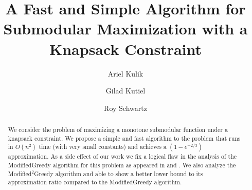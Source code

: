 \documentclass[a4paper,UKenglish,cleveref, autoref]{lipics-v2019}
\title{A Fast and Simple Algorithm for Submodular Maximization with a Knapsack Constraint}
\author{Ariel Kulik}{Department of Computer Science, Technion, Haifa, Israel}{gkutiel@cs.technion.ac.il}{}{}
\author{Gilad Kutiel}{Department of Computer Science, Technion, Haifa, Israel}{arielk@cs.technion.ac.il}{}{}
\author{Roy Schwartz}{Department of Computer Science, Technion, Haifa, Israel}{roy@cs.technion.ac.il}{}{}
\begin{document}
\maketitle

\begin{abstract}
    We consider the problem of maximizing a monotone submodular function under a knapsack constraint.
    We propose a simple and fast algorithm to the problem that runs in $O(n^2)$ time (with very small constants) and achieves a $(1-e^{-2/3})$ approximation.
    As a side effect of our work we fix a logical flaw in the analysis of the ModifiedGreedy algorithm for this problem as appeared in \cite{khuller1999budgeted} and \cite{krause2005note}.
    We also analyze the Modified$^2$Greedy algorithm and able to show a better lower bound to its approximation ratio compared to the ModifiedGreedy algorithm.
\end{abstract}





\end{document}

